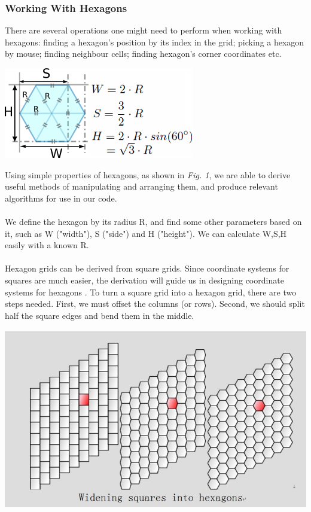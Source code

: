 \documentclass[10pt,a4paper]{article}
\begin{document}
\subsubsection{Working With Hexagons}
There are several operations one might need to perform when working with hexagons: finding a hexagon's position by its index in the grid; picking a hexagon by mouse; finding neighbour cells; finding hexagon's corner coordinates etc.\\

\begin{center}
\includegraphics[scale=1]{diag1.png}\\
\end{center}
Using simple properties of hexagons, as shown in \textit{Fig. 1}, we are able to derive useful methods of manipulating and arranging them, and produce relevant algorithms for use in our code. \\
\\
We define the hexagon by its radius R, and find some other parameters based on it, such as W ("width"), S ("side") and H ("height"). We can calculate W,S,H easily with a known R.\\
\\
Hexagon grids can be derived from square grids. Since coordinate systems for squares are much easier, the derivation will guide us in designing coordinate systems for hexagons \cite{grids}. To turn a square grid into a hexagon grid, there are two steps needed. First, we must offset the columns (or rows). Second, we should split half the square edges and bend them in the middle.
\begin{center}
\includegraphics[scale=0.5]{image11.jpg}\\
\end{center}
\end{document}
